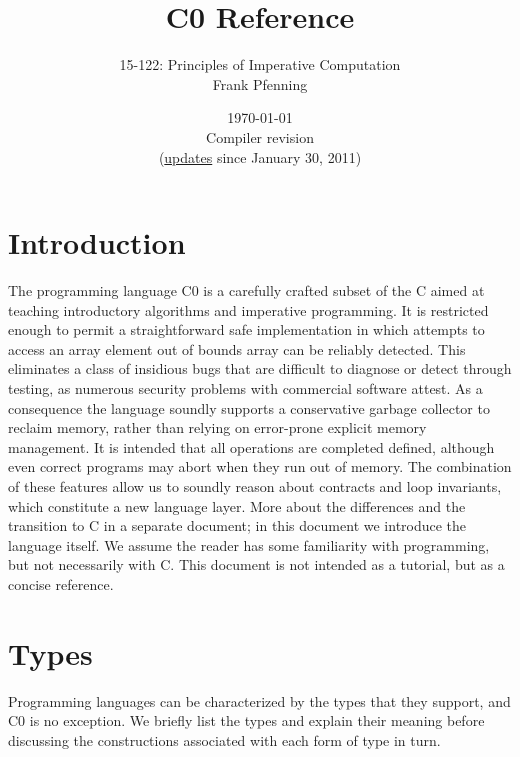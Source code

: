 \documentclass[11pt]{article}
\title{C0 Reference}
\author{15-122: Principles of Imperative Computation \\ Frank Pfenning}
\date{\today\\Compiler revision \rev\\
  (\hyperlink{sec:updates}{updates} since January 30, 2011)}
\begin{document}
\maketitle

\section{Introduction}

The programming language C0 is a carefully crafted subset of the C
aimed at teaching introductory algorithms and imperative programming.
It is restricted enough to permit a straightforward safe
implementation in which attempts to access an array element out of
bounds array can be reliably detected.  This eliminates a class of
insidious bugs that are difficult to diagnose or detect through
testing, as numerous security problems with commercial software
attest.  As a consequence the language soundly supports a conservative
garbage collector to reclaim memory, rather than relying on
error-prone explicit memory management.  It is intended that all
operations are completed defined, although even correct programs may
abort when they run out of memory.  The combination of these features
allow us to soundly reason about contracts and loop invariants, which
constitute a new language layer.  More about the differences and the
transition to C in a separate document; in this document we introduce
the language itself.  We assume the reader has some familiarity with
programming, but not necessarily with C\@.  This document is not intended
as a tutorial, but as a concise reference.

\section{Types}

Programming languages can be characterized by the types that they support,
and C0 is no exception.  We briefly list the types and explain their
meaning before discussing the constructions associated with each
form of type in turn.
\end{document}
